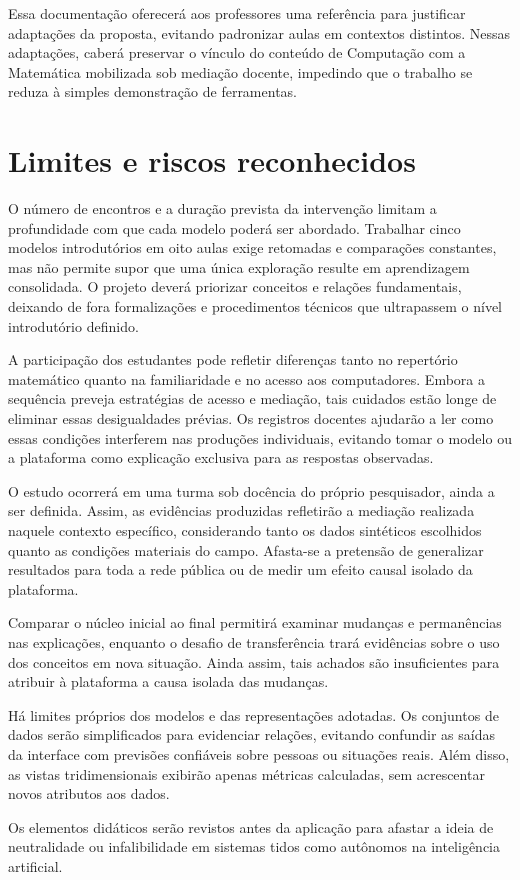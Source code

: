 Essa documentação oferecerá aos professores uma referência para justificar adaptações da proposta, evitando padronizar aulas em contextos distintos. Nessas adaptações, caberá preservar o vínculo do conteúdo de Computação com a Matemática mobilizada sob mediação docente, impedindo que o trabalho se reduza à simples demonstração de ferramentas.

\section{Limites e riscos reconhecidos}

O número de encontros e a duração prevista da intervenção limitam a profundidade com que cada modelo poderá ser abordado. Trabalhar cinco modelos introdutórios em oito aulas exige retomadas e comparações constantes, mas não permite supor que uma única exploração resulte em aprendizagem consolidada. O projeto deverá priorizar conceitos e relações fundamentais, deixando de fora formalizações e procedimentos técnicos que ultrapassem o nível introdutório definido.

A participação dos estudantes pode refletir diferenças tanto no repertório matemático quanto na familiaridade e no acesso aos computadores. Embora a sequência preveja estratégias de acesso e mediação, tais cuidados estão longe de eliminar essas desigualdades prévias. Os registros docentes ajudarão a ler como essas condições interferem nas produções individuais, evitando tomar o modelo ou a plataforma como explicação exclusiva para as respostas observadas.

O estudo ocorrerá em uma turma sob docência do próprio pesquisador, ainda a ser definida. Assim, as evidências produzidas refletirão a mediação realizada naquele contexto específico, considerando tanto os dados sintéticos escolhidos quanto as condições materiais do campo. Afasta-se a pretensão de generalizar resultados para toda a rede pública ou de medir um efeito causal isolado da plataforma.

Comparar o núcleo inicial ao final permitirá examinar mudanças e permanências nas explicações, enquanto o desafio de transferência trará evidências sobre o uso dos conceitos em nova situação. Ainda assim, tais achados são insuficientes para atribuir à plataforma a causa isolada das mudanças.

Há limites próprios dos modelos e das representações adotadas. Os conjuntos de dados serão simplificados para evidenciar relações, evitando confundir as saídas da interface com previsões confiáveis sobre pessoas ou situações reais. Além disso, as vistas tridimensionais exibirão apenas métricas calculadas, sem acrescentar novos atributos aos dados.

Os elementos didáticos serão revistos antes da aplicação para afastar a ideia de neutralidade ou infalibilidade em sistemas tidos como autônomos na inteligência artificial.
